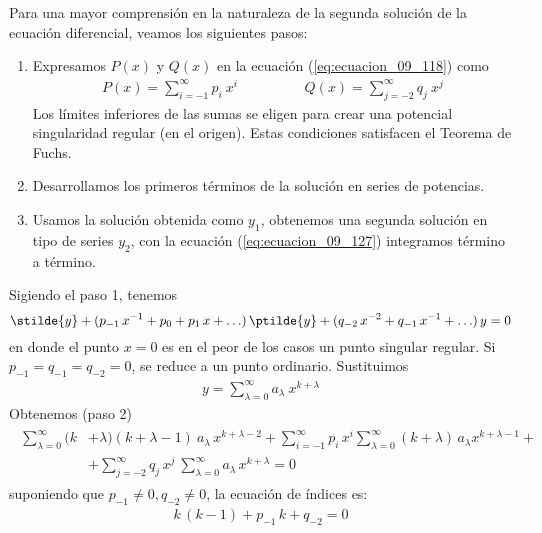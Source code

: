 Para una mayor comprensión en la naturaleza de la segunda solución de la ecuación diferencial, veamos los siguientes pasos:
\begin{enumerate}
\item Expresamos $P(x)$ y $Q(x)$ en la ecuación (\ref{eq:ecuacion_09_118}) como
\begin{align}
P(x) = \sum_{i=-1}^{\infty} p_{i} \: x^{i} \hspace{2cm} Q(x) = \sum_{j=-2}^{\infty} q_{j} \: x^{j}
\label{eq:ecuacion_09_129}
\end{align}
Los límites inferiores de las sumas se eligen para crear una potencial singularidad regular (en el origen). Estas condiciones satisfacen el Teorema de Fuchs.
\item Desarrollamos los primeros términos de la solución en series de potencias.
\item Usamos la solución obtenida como $y_{1}$, obtenemos una segunda solución en tipo de series $y_{2}$, con la ecuación (\ref{eq:ecuacion_09_127}) integramos término a término.
\end{enumerate}
Sigiendo el paso 1, tenemos
\begin{equation}
\stilde{y} + (p_{-1} \, x^{-1} + p_{0} + p_{1} \, x + \ldots) \, \ptilde{y} + (q_{-2} \, x^{-2} + q_{-1} \, x^{-1} + \ldots) \, y = 0
\label{eq:ecuacion_09_130}
\end{equation}
en donde el punto $x = 0$ es en el peor de los casos un punto singular regular. Si $p_{-1} = q_{-1} = q_{-2} = 0$, se reduce a un punto ordinario. Sustituimos
\begin{align*}
y = \sum_{\lambda = 0}^{\infty} a_{\lambda} \: x^{k + \lambda}
\end{align*}
Obtenemos (paso 2)
\begin{align}
\begin{aligned}
\sum_{\lambda=0}^{\infty} (k &+ \lambda)(k + \lambda - 1) \: a_{\lambda} \, x^{k + \lambda - 2} + \sum_{i=-1}^{\infty} p_{i} \, x^{i} \sum_{\lambda=0}^{\infty} (k + \lambda) \,  a_{\lambda} x^{k + \lambda - 1} + \\
&+ \sum_{j=-2}^{\infty} q_{j} \, x^{j} \: \sum_{\lambda=0}^{\infty} a_{\lambda} \, x^{k + \lambda} = 0
\end{aligned}
\label{eq:ecuacion_09_131}
\end{align}
suponiendo que $p_{-1} \neq 0, q_{-2} \neq 0$, la ecuación de índices es:
\begin{align*}
k \, (k - 1) + p_{-1} \, k + q_{-2} = 0
\end{align*}
